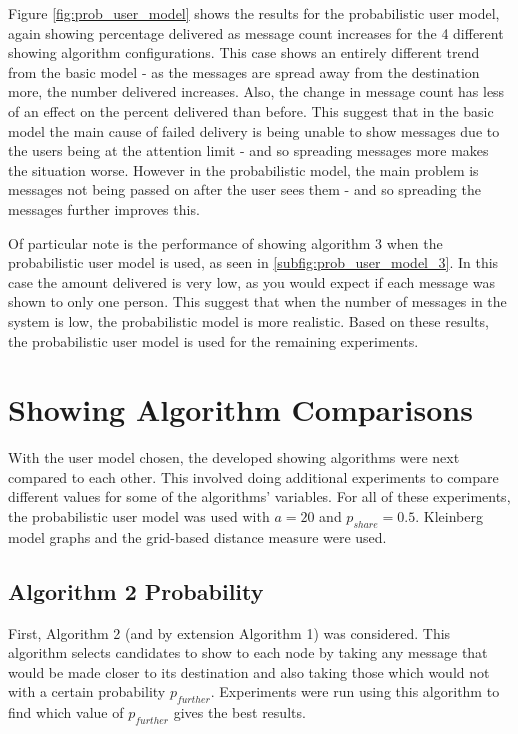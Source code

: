 \documentclass[bsc,frontabs,twoside,singlespacing,parskip,deptreport]{infthesis}     %
\begin{document}
Figure \ref{fig:prob_user_model} shows the results for the probabilistic user model, again showing percentage delivered as message count increases for the 4 different showing algorithm configurations. This case shows an entirely different trend from the basic model - as the messages are spread away from the destination more, the number delivered increases. Also, the change in message count has less of an effect on the percent delivered than before. This suggest that in the basic model the main cause of failed delivery is being unable to show messages due to the users being at the attention limit - and so spreading messages more makes the situation worse. However in the probabilistic model, the main problem is messages not being passed on after the user sees them - and so spreading the messages further improves this.

Of particular note is the performance of showing algorithm 3 when the probabilistic user model is used, as seen in \ref{subfig:prob_user_model_3}. In this case the amount delivered is very low, as you would expect if each message was shown to only one person. This suggest that when the number of messages in the system is low, the probabilistic model is more realistic. Based on these results, the probabilistic user model is used for the remaining experiments.

\section{Showing Algorithm Comparisons}

With the user model chosen, the developed showing algorithms were next compared to each other. This involved doing additional experiments to compare different values for some of the algorithms' variables. For all of these experiments, the probabilistic user model was used with $a = 20$ and $p_{share} = 0.5$. Kleinberg model graphs and the grid-based distance measure were used.

\subsection{Algorithm 2 Probability} \label{subsec:algorithm_2_prob}
First, Algorithm 2 (and by extension Algorithm 1) was considered. This algorithm selects candidates to show to each node by taking any message that would be made closer to its destination and also taking those which would not with a certain probability $p_{further}$. Experiments were run using this algorithm to find which value of $p_{further}$ gives the best results.
\end{document}
